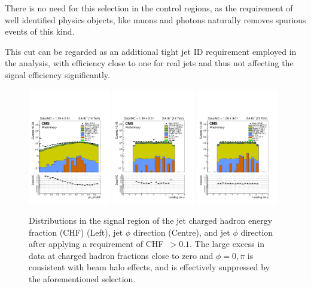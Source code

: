 There is no need for this selection in the control regions, 
as the requirement of well identified physics objects, like muons 
and photons naturally removes spurious events of this kind. 

This cut can be regarded as 
an additional tight jet ID requirement employed in the analysis, 
with efficiency close to one for real jets and thus not affecting the 
signal efficiency significantly. 


\begin{figure}[h!]
    \begin{center}
        {\includegraphics[width=0.32\textwidth]{figures/selection/jet_chHEF_mono_all_before.pdf}}
        {\includegraphics[width=0.32\textwidth]{figures/selection/jet_phi[0]_mono_all_before.pdf}}
        {\includegraphics[width=0.32\textwidth]{figures/selection/jet_phi[0]_mono_all_after.pdf}}
        \caption{Distributions in the signal region of the jet charged hadron
        energy fraction (CHF) (Left), jet $\phi$ direction (Centre), and jet $\phi$
        direction after applying a requirement of {CHF~$>0.1$}. The large excess in data
        at charged hadron fractions close to zero and ${\phi = 0, \pi}$ is consistent with beam
        halo effects, and is effectively suppressed by the aforementioned selection.}
        \label{fig:leadJetCleaning}
    \end{center}
\end{figure}


